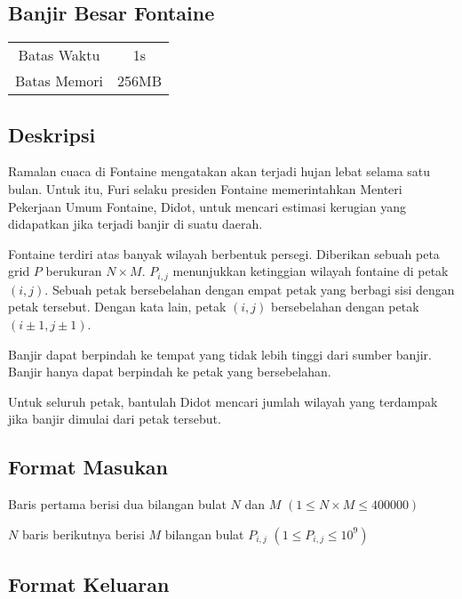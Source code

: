 \documentclass{article}
\begin{document}
\begin{center}

    
    \section*{Banjir Besar Fontaine} %

    \begin{tabular}{ | c c | }
        \hline
        Batas Waktu  & 1s \\    %
        Batas Memori & 256MB \\  %
        \hline
    \end{tabular}
\end{center}

\subsection*{Deskripsi}

Ramalan cuaca di Fontaine mengatakan akan terjadi hujan lebat selama satu bulan. Untuk itu, Furi selaku presiden Fontaine memerintahkan Menteri Pekerjaan Umum Fontaine, Didot, untuk mencari estimasi kerugian yang didapatkan jika terjadi banjir di suatu daerah.

Fontaine terdiri atas banyak wilayah berbentuk persegi. Diberikan sebuah peta grid $P$ berukuran $N \times M$. $P_{i,j}$ menunjukkan ketinggian wilayah fontaine di petak $(i, j)$. Sebuah petak bersebelahan dengan empat petak yang berbagi sisi dengan petak tersebut. Dengan kata lain, petak $(i, j)$ bersebelahan dengan petak $(i \pm 1, j \pm 1)$.

Banjir dapat berpindah ke tempat yang tidak lebih tinggi dari sumber banjir. Banjir hanya dapat berpindah ke petak yang bersebelahan.

Untuk seluruh petak, bantulah Didot mencari jumlah wilayah yang terdampak jika banjir dimulai dari petak tersebut.

\subsection*{Format Masukan}

Baris pertama berisi dua bilangan bulat $N$ dan $M$ $(1 \leq N \times M \leq 400000)$

$N$ baris berikutnya berisi $M$ bilangan bulat $P_{i,j}$ $(1 \leq P_{i,j} \leq 10^9)$

\subsection*{Format Keluaran}
\end{document}
